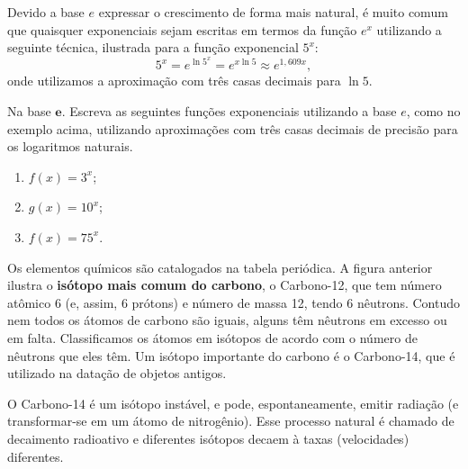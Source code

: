 Devido a base $e$ expressar o crescimento de forma mais natural, é muito comum que quaisquer exponenciais sejam escritas em termos da função $e^x$ utilizando a seguinte técnica, ilustrada para a função exponencial $5^x$:
$$
5^x = e^{\ln 5^x} = e^{x\ln 5} \approx e^{1{,}609 x},
$$
onde utilizamos a aproximação com três casas decimais para $\ln 5$.

\begin{task}{Na base $\bm{e}$.}
Escreva as seguintes funções exponenciais utilizando a base $e$, como no exemplo acima, utilizando aproximações com três casas decimais de precisão para os logaritmos naturais.
\begin{enumerate}
\item $f(x)=3^x$;
\item $g(x)=10^x$;
\item $f(x)=75^x$.
\end{enumerate}
\end{task}


\begin{figure}[H]
\centering

\end{figure}


Os elementos químicos são catalogados na tabela periódica. A figura anterior ilustra o \textbf{isótopo mais comum do carbono}, o Carbono-12, que tem número atômico 6 (e, assim, 6 prótons) e número de massa 12, tendo 6 nêutrons. Contudo nem todos os átomos de carbono são iguais, alguns têm nêutrons em excesso ou em falta. Classificamos os átomos em isótopos de acordo com o número de nêutrons que eles têm. Um isótopo importante do carbono é o Carbono-14, que é utilizado na datação de objetos antigos.

O Carbono-14 é um isótopo instável, e pode, espontaneamente, emitir radiação (e transformar-se em um átomo de nitrogênio). Esse processo natural é chamado de decaimento radioativo e diferentes isótopos decaem à taxas (velocidades) diferentes.


